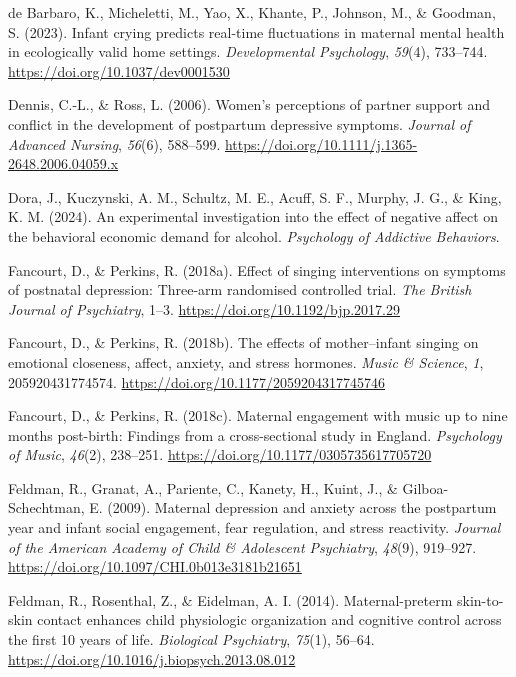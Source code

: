 \documentclass[
]{article}
\newlength{\cslhangindent}
\newenvironment{CSLReferences}[2] %
 {\begin{list}{}{%
  \setlength{\itemindent}{0pt}
  \setlength{\leftmargin}{0pt}
  \setlength{\parsep}{0pt}
  \ifodd #1
   \setlength{\leftmargin}{\cslhangindent}
   \setlength{\itemindent}{-1\cslhangindent}
  \fi
  \setlength{\itemsep}{#2\baselineskip}}}
 {\end{list}}
\begin{document}
\begin{CSLReferences}{1}{0}
de Barbaro, K., Micheletti, M., Yao, X., Khante, P., Johnson, M., \&
Goodman, S. (2023). Infant crying predicts real-time fluctuations in
maternal mental health in ecologically valid home settings.
\emph{Developmental Psychology}, \emph{59}(4), 733--744.
\url{https://doi.org/10.1037/dev0001530}

Dennis, C.-L., \& Ross, L. (2006). Women's perceptions of partner
support and conflict in the development of postpartum depressive
symptoms. \emph{Journal of Advanced Nursing}, \emph{56}(6), 588--599.
\url{https://doi.org/10.1111/j.1365-2648.2006.04059.x}

Dora, J., Kuczynski, A. M., Schultz, M. E., Acuff, S. F., Murphy, J. G.,
\& King, K. M. (2024). An experimental investigation into the effect of
negative affect on the behavioral economic demand for alcohol.
\emph{Psychology of Addictive Behaviors}.

Fancourt, D., \& Perkins, R. (2018a). Effect of singing interventions on
symptoms of postnatal depression: {Three-arm} randomised controlled
trial. \emph{The British Journal of Psychiatry}, 1--3.
\url{https://doi.org/10.1192/bjp.2017.29}

Fancourt, D., \& Perkins, R. (2018b). The effects of mother--infant
singing on emotional closeness, affect, anxiety, and stress hormones.
\emph{Music \& Science}, \emph{1}, 205920431774574.
\url{https://doi.org/10.1177/2059204317745746}

Fancourt, D., \& Perkins, R. (2018c). Maternal engagement with music up
to nine months post-birth: {Findings} from a cross-sectional study in
{England}. \emph{Psychology of Music}, \emph{46}(2), 238--251.
\url{https://doi.org/10.1177/0305735617705720}

Feldman, R., Granat, A., Pariente, C., Kanety, H., Kuint, J., \&
Gilboa-Schechtman, E. (2009). Maternal depression and anxiety across the
postpartum year and infant social engagement, fear regulation, and
stress reactivity. \emph{Journal of the American Academy of Child \&
Adolescent Psychiatry}, \emph{48}(9), 919--927.
\url{https://doi.org/10.1097/CHI.0b013e3181b21651}

Feldman, R., Rosenthal, Z., \& Eidelman, A. I. (2014). Maternal-preterm
skin-to-skin contact enhances child physiologic organization and
cognitive control across the first 10 years of life. \emph{Biological
Psychiatry}, \emph{75}(1), 56--64.
\url{https://doi.org/10.1016/j.biopsych.2013.08.012}


\end{CSLReferences}
\end{document}
